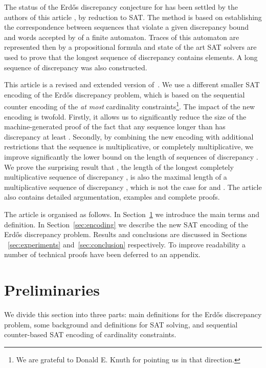 \documentclass{article} \usepackage[utf8]{inputenc}
\begin{document}
The status of the Erd\H{o}s discrepancy conjecture for  has been
settled by the authors of this article 
\cite{KLArx14}, \cite{KLSAT14} by reduction to SAT.  The method is
based on establishing the correspondence between  sequences that violate
a given discrepancy bound and words accepted by of a finite automaton.  Traces
of this automaton are represented then by a propositional formula and state
of the art SAT solvers are used to prove that the longest  sequence of
discrepancy  contains  elements. 
A  long  sequence of discrepancy  was also constructed.

This article is a revised and extended version of~\cite{KLSAT14}.  We use a
different smaller SAT encoding of the Erd\H{o}s discrepancy problem, which is
based on the sequential counter encoding of the \emph{at
most} cardinality constraints\footnote{We are grateful to Donald E. Knuth for
pointing us in that direction.}. The impact of the new encoding is twofold.
Firstly, it allows us to significantly reduce the size of the machine-generated
proof of the fact that any sequence longer than   has discrepancy at
least .
Secondly, by combining the new encoding with additional restrictions that the
sequence is multiplicative, or completely multiplicative, we improve
significantly the lower bound on the length of sequences of discrepancy . We
prove the surprising result that , the length  of the longest completely multiplicative
sequence of discrepancy , is also the maximal length of a 
multiplicative sequence of discrepancy , which is not the case for  and
.  The article also contains
detailed argumentation, examples and complete proofs.

The article is organised as follows. In Section~\ref{sec:preliminaries} we
introduce the main terms and definition. In Section~\ref{sec:encoding} we
describe the new SAT encoding of the Erd\H{o}s discrepancy problem.
Results and conclusions are discussed in Sections ~\ref{sec:experiments}
and~\ref{sec:conclusion} respectively.  To improve readability a number of
technical proofs have been deferred to an appendix.




\section{Preliminaries}\label{sec:preliminaries}
We divide this section into three parts: main definitions for the Erd\H{o}s 
discrepancy problem, some background and definitions for SAT solving, and
sequential counter-based SAT encoding of cardinality constraints.
\end{document}
